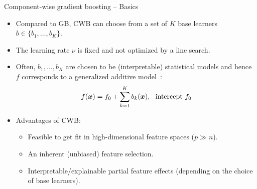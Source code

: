 \documentclass[t,10pt]{beamer}
\begin{document}
\begin{frame}{Component-wise gradient boosting -- Basics}
  \begin{itemize}
    \item
      Compared to GB, CWB can choose from a set of $K$ base learners $b \in \{b_1, \dots, b_K\}$.

    \item
      The learning rate $\nu$ is fixed and not optimized by a line search.

    \item
      Often, $b_1, \dots, b_K$ are chosen to be (interpretable) statistical models and hence $f$ corresponds to a generalized additive model~\citep[GAM;][]{hastie2017generalized}: \[f(\xv) = f_0 + \sum_{k=1}^K b_k(\xv), \ \ \text{intercept}\ f_0\]

    \item
      Advantages of CWB:
      \begin{itemize}
        \item
          Feasible to get fit in high-dimensional feature spaces ($p \gg n$).

        \item
          An inherent (unbiased) feature selection.

        \item
          Interpretable/explainable partial feature effects (depending on the choice of base learners).
      \end{itemize}
  \end{itemize}
\end{frame}
\end{document}
